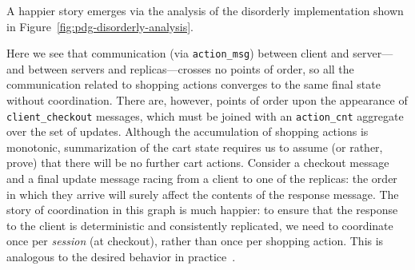 A happier story emerges via the analysis of the disorderly implementation
shown in Figure~\ref{fig:pdg-disorderly-analysis}.

Here we see that communication (via \texttt{action\_msg}) between client and server---and between servers and replicas---crosses no points of order, so all the
communication related to shopping actions converges to the same final state without coordination.
There are, however, points of order upon the appearance of \texttt{client\_checkout}
messages, which must be joined with an \texttt{action\_cnt} aggregate over the set of updates.  Although the 
accumulation of shopping actions is monotonic, summarization of the cart state
requires us to assume (or rather, prove) that there will be no further cart actions.
Consider a checkout message and a final update message racing from a client
to one of the replicas: the order in which they arrive will surely affect
the contents of the response message.  
The story of coordination in this graph is much happier: to
ensure that the response to the client is deterministic and consistently replicated, we need to coordinate once per {\em session} (at checkout), rather than once per shopping action.  This is analogous to the desired behavior in practice~\cite{quicksand}.
%
